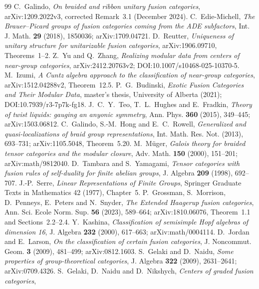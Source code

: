 \documentclass[11pt,reqno]{amsart}
\theoremstyle{definition}
\theoremstyle{remark}
\begin{document}
\begin{thebibliography}{99}
 C.~Galindo, \emph{On braided and ribbon unitary fusion categories}, arXiv:1209.2022v3, corrected Remark~3.1 (December 2024).
 C.~Edie-Michell, \emph{The Brauer--Picard groups of fusion categories coming from the ADE subfactors}, Int. J. Math. \textbf{29} (2018), 1850036; arXiv:1709.04721.
 D.~Reutter, \emph{Uniqueness of unitary structure for unitarizable fusion categories}, arXiv:1906.09710, Theorems~1--2.
 Z.~Yu and Q.~Zhang, \emph{Realizing modular data from centers of near-group categories}, arXiv:2412.20763v2; DOI:10.1007/s10468-025-10370-5.
 M.~Izumi, \emph{A Cuntz algebra approach to the classification of near-group categories}, arXiv:1512.04288v2, Theorem~12.5.
 P.~G.~Budinski, \emph{Exotic Fusion Categories and Their Modular Data}, master's thesis, University of Alberta (2021); DOI:10.7939/r3-7p7k-fg18.
 J.~C.~Y.~Teo, T.~L.~Hughes and E.~Fradkin, \emph{Theory of twist liquids: gauging an anyonic symmetry}, Ann. Phys. \textbf{360} (2015), 349--445; arXiv:1503.06812.
 C.~Galindo, S.-M.~Hong and E.~C.~Rowell, \emph{Generalized and quasi-localizations of braid group representations}, Int. Math. Res. Not. (2013), 693--731; arXiv:1105.5048, Theorem~5.20.
 M.~M\"uger, \emph{Galois theory for braided tensor categories and the modular closure}, Adv. Math. \textbf{150} (2000), 151--201; arXiv:math/9812040.
 D.~Tambara and S.~Yamagami, \emph{Tensor categories with fusion rules of self-duality for finite abelian groups}, J. Algebra \textbf{209} (1998), 692--707.
 J.-P.~Serre, \emph{Linear Representations of Finite Groups}, Springer Graduate Texts in Mathematics 42 (1977), Chapter~5.
 P.~Grossman, S.~Morrison, D.~Penneys, E.~Peters and N.~Snyder, \emph{The Extended Haagerup fusion categories}, Ann. Sci. Ecole Norm. Sup. \textbf{56} (2023), 589--664; arXiv:1810.06076, Theorem~1.1 and Sections~2.2--2.4.
 Y.~Kashina,
\emph{Classification of semisimple Hopf algebras of dimension 16},
J. Algebra \textbf{232} (2000), 617--663; arXiv:math/0004114.
 D.~Jordan and E.~Larson,
\emph{On the classification of certain fusion categories},
J. Noncommut. Geom. \textbf{3} (2009), 481--499; arXiv:0812.1603.
 S.~Gelaki and D.~Naidu,
\emph{Some properties of group-theoretical categories},
J. Algebra \textbf{322} (2009), 2631--2641; arXiv:0709.4326.
 S.~Gelaki, D.~Naidu and D.~Nikshych,
\emph{Centers of graded fusion categories},

\end{thebibliography}
\end{document}
